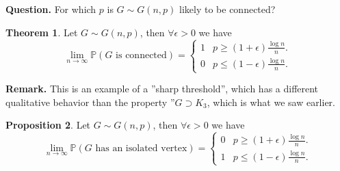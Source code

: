 \documentclass{article}
\theoremstyle{definition}
\newtheorem{theorem}{Theorem}[section]
\newtheorem{prop}[theorem]{Proposition}
\begin{document}
\textbf{Question.} For which $p$ is $G\sim G(n,p)$ likely to be connected? 
\begin{theorem}\label{6.4}
    Let $G \sim G(n,p)$, then $\forall \epsilon>0$ we have \[
    \lim_{n \to \infty} \mathbb{P}(G \text{ is connected}) = \begin{cases}
        1 &p\ge (1+\epsilon)\frac{\log n}{n}.\\
        0 &p\le (1-\epsilon)\frac{\log n}{n}.
    \end{cases}
    \]
\end{theorem}
\textbf{Remark.} This is an example of a ''sharp threshold'', which has a different qualitative behavior than the property ''$G \supset K_3$, which is what we saw earlier.
\begin{prop}
    Let $G\sim G(n,p)$, then $\forall \epsilon>0$ we have \[
    \lim_{n \to \infty}\mathbb{P}(G \text{ has an isolated vertex})=\begin{cases}
        0 &p\ge (1+\epsilon)\frac{\log n}{n}.\\
        1 &p\le (1-\epsilon)\frac{\log n}{n}.
    \end{cases}
    \]
\end{prop}
\end{document}
